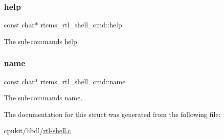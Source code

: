 \subsubsection{\texorpdfstring{help}{help}}
{\footnotesize\ttfamily const char$\ast$ rtems\+\_\+rtl\+\_\+shell\+\_\+cmd\+::help}

The sub-\/command\textquotesingle{}s help. \mbox{\label{structrtems__rtl__shell__cmd_ab996e376e48557408360700f3c75f0a2}} 
\subsubsection{\texorpdfstring{name}{name}}
{\footnotesize\ttfamily const char$\ast$ rtems\+\_\+rtl\+\_\+shell\+\_\+cmd\+::name}

The sub-\/command\textquotesingle{}s name. 

The documentation for this struct was generated from the following file\+:\begin{DoxyCompactItemize}
\item 
cpukit/libdl/\mbox{\hyperlink{rtl-shell_8c}{rtl-\/shell.\+c}}\end{DoxyCompactItemize}
